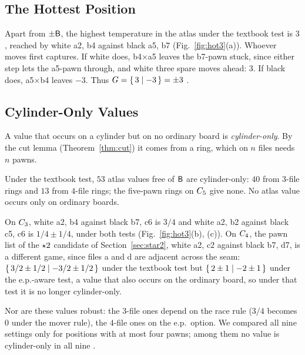 \subsection{The Hottest Position}
Apart from $\pm\mathsf{B}$, the highest temperature in the atlas under the textbook test is $3$, reached by white
a2, b4 against black a5, b7 (Fig.~\ref{fig:hot3}(a)). Whoever moves first captures. If white does,
b4$\times$a5 leaves the b7-pawn stuck, since either step lets the a5-pawn through, and white three spare
moves ahead: $3$. If black does, a5$\times$b4 leaves $-3$. Thus $G=\{\,3 \mid -3\,\}=\pm3$ .

\subsection{Cylinder-Only Values}
A value that occurs on a cylinder but on no ordinary board is \emph{cylinder-only}. By the cut lemma
(Theorem~\ref{thm:cut}) it comes from a ring, which on $n$ files needs $n$ pawns.

\begin{proposition}[\lab{C1}]\label{prop:cylonly}
Under the textbook test, $53$ atlas values free of $\mathsf{B}$ are cylinder-only: $40$ from $3$-file rings and
$13$ from $4$-file rings; the five-pawn rings on $C_{5}$ give none. No atlas value occurs only on ordinary boards.
\end{proposition}

On $C_{3}$, white a2, b4 against black b7, c6 is $3/4$ and white a2, b2 against black c5, c6 is
$1/4\pm1/4$, under both tests (Fig.~\ref{fig:hot3}(b), (c)). On $C_{4}$, the pawn list of the $\mathord{\star2}$
candidate of Section~\ref{sec:star2}, white a2, c2 against black b7, d7, is a different game, since files a and
d are adjacent across the seam: $\{\,3/2\pm1/2 \mid -3/2\pm1/2\,\}$ under the textbook
test but $\{\,2\pm1 \mid -2\pm1\,\}$ under the e.p.-aware test, a value that also occurs on the ordinary
board, so under that test it is no longer cylinder-only.

Nor are these values robust: the $3$-file ones depend on the race rule ($3/4$ becomes $0$ under the mover
rule), the $4$-file ones on the e.p.\ option. We compared all nine settings only for positions with at most
four pawns; among them no value is cylinder-only in all nine .
